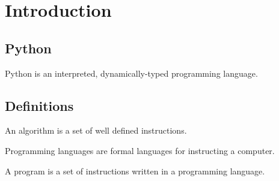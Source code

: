\chapter{Introduction}

\section{Python}
Python is an interpreted, dynamically-typed programming language.

\section{Definitions}
An algorithm is a set of well defined instructions.

Programming languages are formal languages for instructing a computer.

A program is a set of instructions written in a programming language.
